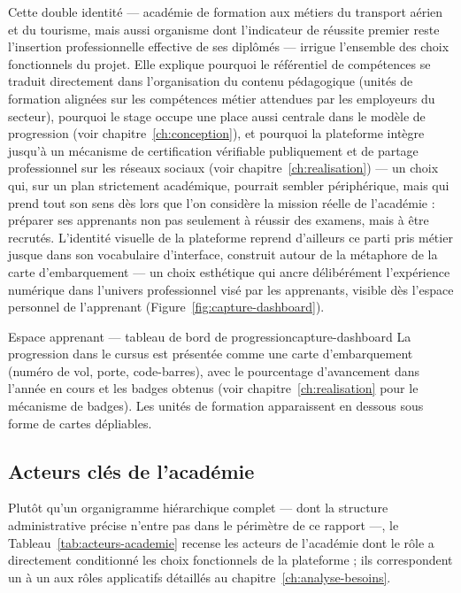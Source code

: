 Cette double identité --- académie de formation aux métiers du transport
aérien et du tourisme, mais aussi organisme dont l'indicateur de réussite
premier reste l'insertion professionnelle effective de ses diplômés ---
irrigue l'ensemble des choix fonctionnels du projet. Elle explique
pourquoi le référentiel de compétences se traduit directement dans
l'organisation du contenu pédagogique (unités de formation alignées sur
les compétences métier attendues par les employeurs du secteur), pourquoi
le stage occupe une place aussi centrale dans le modèle de progression
(voir chapitre~\ref{ch:conception}), et pourquoi la plateforme intègre
jusqu'à un mécanisme de certification vérifiable publiquement et de
partage professionnel sur les réseaux sociaux (voir
chapitre~\ref{ch:realisation}) --- un choix qui, sur un plan strictement
académique, pourrait sembler périphérique, mais qui prend tout son sens
dès lors que l'on considère la mission réelle de l'académie : préparer ses
apprenants non pas seulement à réussir des examens, mais à être recrutés.
L'identité visuelle de la plateforme reprend d'ailleurs ce parti pris
métier jusque dans son vocabulaire d'interface, construit autour de la
métaphore de la carte d'embarquement --- un choix esthétique qui ancre
délibérément l'expérience numérique dans l'univers professionnel visé par
les apprenants, visible dès l'espace personnel de l'apprenant
(Figure~\ref{fig:capture-dashboard}).

  {Espace apprenant --- tableau de bord de progression}{capture-dashboard}
  {La progression dans le cursus est présentée comme une carte
   d'embarquement (numéro de vol, porte, code-barres), avec le
   pourcentage d'avancement dans l'année en cours et les badges obtenus
   (voir chapitre~\ref{ch:realisation} pour le mécanisme de badges). Les
   unités de formation apparaissent en dessous sous forme de cartes
   dépliables.}

\subsection{Acteurs clés de l'académie}

Plutôt qu'un organigramme hiérarchique complet --- dont la structure
administrative précise n'entre pas dans le périmètre de ce rapport ---, le
Tableau~\ref{tab:acteurs-academie} recense les acteurs de l'académie dont
le rôle a directement conditionné les choix fonctionnels de la
plateforme ; ils correspondent un à un aux rôles applicatifs détaillés au
chapitre~\ref{ch:analyse-besoins}.


